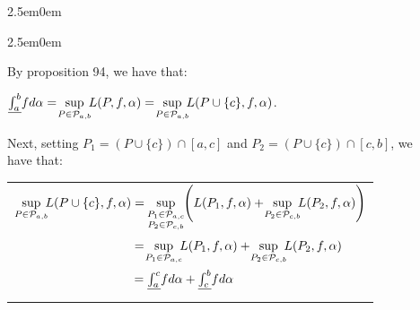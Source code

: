 \documentclass{book}
\newenvironment{myIndent}{%
   \begin{adjustwidth}{2.5em}{0em}%
}{%
   \end{adjustwidth}%
}
\newcommand{\retTwo}{\hfill\bigbreak}
\begin{document}
{\begin{myIndent}
\begin{enumerate}
{\begin{myIndent}
         By proposition 94, we have that:
         
         {\centering$\underline{\int_a^b}fd\alpha = \hspace{-0.2em}\sup\limits_{P \in \mathcal{P}_{a,b}}\hspace{-0.4em}L(P, f, \alpha) = \hspace{-0.2em}\sup\limits_{P \in \mathcal{P}_{a,b}}\hspace{-0.4em}L(P \cup \{c\}, f, \alpha)$.\retTwo\par}

         Next, setting $P_1 = \left(P \cup \{c\}\right) \cap [a, c]$ and $P_2 = \left(P \cup \{c\}\right) \cap [c, b]$, we\\ have that:

         {\centering
         \begin{tabular}{l}
            $\sup\limits_{P \in \mathcal{P}_{a,b}}\hspace{-0.4em}L(P \cup \{c\}, f, \alpha) = \hspace{-0.2em}\sup\limits_{
            \begin{smallmatrix}
               P_1 \in \mathcal{P}_{a,c}\\
               P_2 \in \mathcal{P}_{c,b}
            \end{smallmatrix}}\hspace{-0.4em}\left(L(P_1, f, \alpha) + \hspace{-0.2em}\sup\limits_{P_2 \in \mathcal{P}_{c,b}}\hspace{-0.4em}L(P_2, f, \alpha)\right)$\\ [32pt]

            $\phantom{\sup\limits_{P \in \mathcal{P}_{a,b}}\hspace{-0.4em}L(P \cup \{c\}, f, \alpha)} = \hspace{-0.2em}\sup\limits_{P_1 \in \mathcal{P}_{a,c}}\hspace{-0.4em}L(P_1, f, \alpha) + \hspace{-0.2em}\sup\limits_{P_2 \in \mathcal{P}_{c,b}}\hspace{-0.4em}L(P_2, f, \alpha)$\\ [16pt]

            $\phantom{\sup\limits_{P \in \mathcal{P}_{a,b}}\hspace{-0.4em}L(P \cup \{c\}, f, \alpha)} = \underline{\int_a^c}fd\alpha + \underline{\int_c^b}fd\alpha$\\
         \end{tabular}\retTwo\par}
      \end{myIndent}}


\end{enumerate}
\end{myIndent}}
\end{document}
